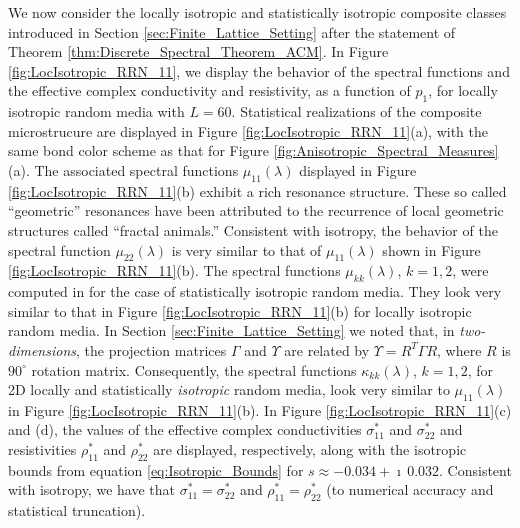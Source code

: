 \documentclass{cmslatex}
\begin{document}
We now consider the locally isotropic and statistically isotropic
composite classes introduced in Section
\ref{sec:Finite_Lattice_Setting} after the statement of Theorem
\ref{thm:Discrete_Spectral_Theorem_ACM}. In Figure
\ref{fig:LocIsotropic_RRN_11}, we display the behavior of the 
spectral functions and the effective complex conductivity and
resistivity, as a function of $p_1$, for locally isotropic random
media with $L=60$. Statistical realizations of the composite microstrucure
are displayed in Figure \ref{fig:LocIsotropic_RRN_11}(a), with the
same bond color scheme as that for Figure
\ref{fig:Anisotropic_Spectral_Measures}(a). The
associated spectral functions $\mu_{11}(\lambda)$ displayed in Figure
\ref{fig:LocIsotropic_RRN_11}(b) exhibit a rich 
resonance structure. These so called ``geometric'' resonances have
been attributed \cite{Jonckheere_Luck_JPA_1998} to the recurrence of
local geometric structures called ``fractal animals.''  Consistent
with isotropy, the behavior of the spectral function $\mu_{22}(\lambda)$ is
very similar to that of $\mu_{11}(\lambda)$ shown in Figure
\ref{fig:LocIsotropic_RRN_11}(b). The spectral functions $\mu_{kk}(\lambda)$,
$k=1,2$, were computed in \cite{Murphy:JMP:063506} for the case of
statistically isotropic random media. They look very similar to that
in Figure \ref{fig:LocIsotropic_RRN_11}(b) for locally isotropic
random media.  In Section \ref{sec:Finite_Lattice_Setting} we noted
that, in \emph{two-dimensions}, the projection matrices $\Gamma$ and $\Upsilon$
are related by $\Upsilon=R^T\Gamma R$, where $R$ is $90^\circ$ rotation
matrix. Consequently, the spectral functions $\kappa_{kk}(\lambda)$, $k=1,2$, for
2D locally and statistically \emph{isotropic} random media, look very
similar to $\mu_{11}(\lambda)$ in Figure \ref{fig:LocIsotropic_RRN_11}(b). In
Figure \ref{fig:LocIsotropic_RRN_11}(c) and (d), the values of the
effective complex conductivities $\sigma^*_{11}$ and $\sigma^*_{22}$ and
resistivities $\rho^*_{11}$ and $\rho^*_{22}$ are displayed, respectively,
along with the isotropic bounds from equation
\eqref{eq:Isotropic_Bounds} for $s\approx-0.034+\imath\,0.032$. Consistent with
isotropy, we have that $\sigma^*_{11}=\sigma^*_{22}$ and $\rho^*_{11}=\rho^*_{22}$ (to
numerical accuracy and statistical truncation). 
\end{document}

